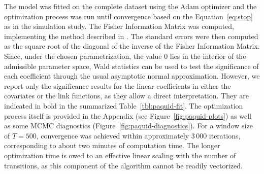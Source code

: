 \documentclass{sn-jnl}
\begin{document}
The model was fitted on the complete dataset using the Adam optimizer and the optimization process was run until convergence based on the Equation~\ref{eq:stop} as in the simulation study. The Fisher Information Matrix was computed, implementing the method described in \cite{baey2023efficient}. The standard errors were then computed as the square root of the diagonal of the inverse of the Fisher Information Matrix. Since, under the chosen parametrization, the value $0$ lies in the interior of the admissible parameter space, Wald statistics can be used to test the significance of each coefficient through the usual asymptotic normal approximation. However, we report only the significance results for the linear coefficients  in either the covariates or the link functions, as they allow a direct interpretation. They are indicated in bold in the summarized Table~\ref{tbl:paquid-fit}. The optimization process itself is provided in the Appendix (see Figure~\ref{fig:paquid-plots}) as well as some MCMC diagnostics (Figure~\ref{fig:paquid-diagnostics}). For a window size of $T = 500$, convergence was achieved within approximately $3 \, 000$ iterations, corresponding to about two minutes of computation time. 
The longer optimization time is owed to an effective linear scaling with the number of transitions, as this component of the algorithm cannot be readily vectorized.
\end{document}
